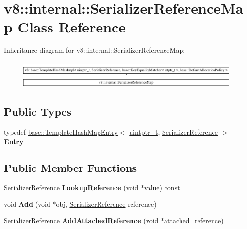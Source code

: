 \hypertarget{classv8_1_1internal_1_1SerializerReferenceMap}{}\section{v8\+:\+:internal\+:\+:Serializer\+Reference\+Map Class Reference}
\label{classv8_1_1internal_1_1SerializerReferenceMap}
Inheritance diagram for v8\+:\+:internal\+:\+:Serializer\+Reference\+Map\+:\begin{figure}[H]
\begin{center}
\leavevmode
\includegraphics[height=1.435897cm]{classv8_1_1internal_1_1SerializerReferenceMap}
\end{center}
\end{figure}
\subsection*{Public Types}
\begin{DoxyCompactItemize}
\item 
\mbox{\label{classv8_1_1internal_1_1SerializerReferenceMap_ae75d8b94346f2c0096315673aee53210}} 
typedef \mbox{\hyperlink{structv8_1_1base_1_1TemplateHashMapEntry}{base\+::\+Template\+Hash\+Map\+Entry}}$<$ \mbox{\hyperlink{classuintptr__t}{uintptr\+\_\+t}}, \mbox{\hyperlink{classv8_1_1internal_1_1SerializerReference}{Serializer\+Reference}} $>$ {\bfseries Entry}
\end{DoxyCompactItemize}
\subsection*{Public Member Functions}
\begin{DoxyCompactItemize}
\item 
\mbox{\label{classv8_1_1internal_1_1SerializerReferenceMap_a1f385cb0dc4a8fa2f0844c333481edbf}} 
\mbox{\hyperlink{classv8_1_1internal_1_1SerializerReference}{Serializer\+Reference}} {\bfseries Lookup\+Reference} (void $\ast$value) const
\item 
\mbox{\label{classv8_1_1internal_1_1SerializerReferenceMap_a35c46c491a36d189e48799ce5f03cd35}} 
void {\bfseries Add} (void $\ast$obj, \mbox{\hyperlink{classv8_1_1internal_1_1SerializerReference}{Serializer\+Reference}} reference)
\item 
\mbox{\label{classv8_1_1internal_1_1SerializerReferenceMap_a60505a457cc43861c131f0a7325ba675}} 
\mbox{\hyperlink{classv8_1_1internal_1_1SerializerReference}{Serializer\+Reference}} {\bfseries Add\+Attached\+Reference} (void $\ast$attached\+\_\+reference)
\end{DoxyCompactItemize}
